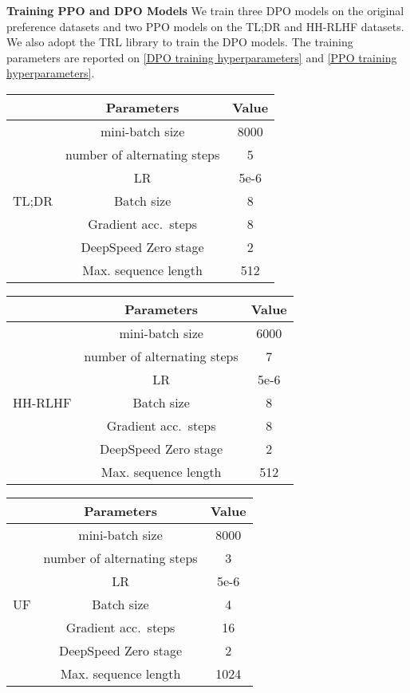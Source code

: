 \textbf{Training PPO and DPO Models} We train three DPO models on the original preference datasets and two PPO models on the TL;DR and HH-RLHF datasets. We also adopt the TRL library to train the DPO models. The training parameters are reported on \cref{DPO training hyperparameters} and \cref{PPO training hyperparameters}.

\begin{table*}[htbp]
    \centering
    \begin{tabular}{ccc}
        \toprule & Parameters& Value\\
        \midrule
        \multirow{8}{*}[-0ex]{TL;DR} 
        & mini-batch size & 8000\\
        & number of alternating steps & 5 \\
        & LR & 5e-6\\
        & Batch size & 8 \\
        & Gradient acc.\ steps & 8\\
        & DeepSpeed Zero stage & 2 \\
        & Max. sequence length & 512 \\
        \bottomrule
    \end{tabular}
    \vspace{1em}
    \begin{tabular}{ccc}
        \toprule & Parameters& Value\\
        \midrule
        \multirow{8}{*}[-0ex]{HH-RLHF} 
        & mini-batch size & 6000\\
        & number of alternating steps & 7 \\
        & LR & 5e-6\\
        & Batch size & 8 \\
        & Gradient acc.\ steps & 8\\
        & DeepSpeed Zero stage & 2 \\
        & Max. sequence length & 512 \\
        \bottomrule
    \end{tabular}
    \begin{tabular}{ccc}
        \toprule & Parameters& Value\\
        \midrule
        \multirow{8}{*}[-0ex]{UF} 
        & mini-batch size & 8000\\
        & number of alternating steps & 3 \\
        & LR & 5e-6\\
        & Batch size & 4 \\
        & Gradient acc.\ steps & 16\\
        & DeepSpeed Zero stage & 2 \\
        & Max. sequence length & 1024 \\
        \bottomrule
    \end{tabular}
    \caption{Training Hyperparameters for reward model trained}
    \label{RM training hyperparameters}
\end{table*}

